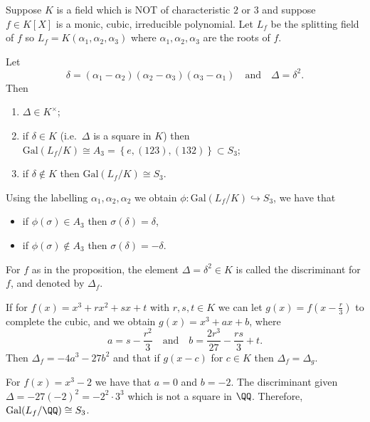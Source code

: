 \documentclass[12pt, a4paper]{article}
\newcommand{\gal}{\text{Gal}}
\begin{document}
\begin{mdprop}
    Suppose \(K\) is a field which is NOT of characteristic \(2\) or \(3\) and suppose \(f \in K[X]\) is a monic, cubic, irreducible polynomial. Let \(L_f\) be the splitting field of \(f\) so \(L_f = K(\alpha_1,\alpha_2,\alpha_3)\) where \(\alpha_1,\alpha_2,\alpha_3\) are the roots of \(f\). 

    Let 
    \[\delta=(\alpha_1-\alpha_2)(\alpha_2-\alpha_3)(\alpha_3-\alpha_1) \quad \text{and} \quad \Delta=\delta^2.\]
    Then
    \begin{enumerate}
        \item \(\Delta \in K^{\times}\);
        \item if \(\delta\in K\) (i.e.\ \(\Delta\) is a square in \(K\)) then \(\gal(L_f/K) \cong A_3 =\left\{ e,(123),(132) \right\} \subset S_3\);
        \item if \(\delta\not\in K\) then \(\gal(L_f/K) \cong S_3\).
    \end{enumerate}
\end{mdprop}

\begin{corollary}
    Using the labelling \(\alpha_1,\alpha_2,\alpha_2\) we obtain \(\phi:\gal(L_f/K) \hookrightarrow S_3\), we have that 
    \begin{itemize}
        \item if \(\phi(\sigma) \in A_3\) then \(\sigma(\delta)=\delta\),
        \item if \(\phi(\sigma) \not\in A_3\) then \(\sigma(\delta)=-\delta\). 
    \end{itemize}
\end{corollary}

\begin{definition}
    For \(f\) as in the proposition, the element \(\Delta = \delta^2 \in K\)  is called the discriminant for \(f\), and denoted by \(\Delta_f\).
\end{definition}

\begin{mdprop}
    If for \(f(x) =x^3+rx^2+sx+t\) with \(r,s,t\in K\) we can let \(g(x) = f\left( x-\frac{r}{3} \right)\) to complete the cubic, and we obtain \(g(x)=x^3+ax+b\), where
    \[a=s-\frac{r^2}{3} \quad \text{and} \quad b=\frac{2r^3}{27}-\frac{rs}{3}+t.\]
    Then \(\Delta_f = -4a^3-27b^2\) and that if \(g(x-c)\) for \(c \in K\) then \(\Delta_f=\Delta_g\). 
\end{mdprop}

\begin{example}
    For \(f(x)=x^3-2\) we have that \(a=0\) and \(b=-2\). The discriminant given \(\Delta=-27(-2)^2=-2^2\cdot 3^3\) which is not a square in \(\QQ\). Therefore, \(\gal(L_f/\QQ) \cong S_3\). 
\end{example}
\end{document}
